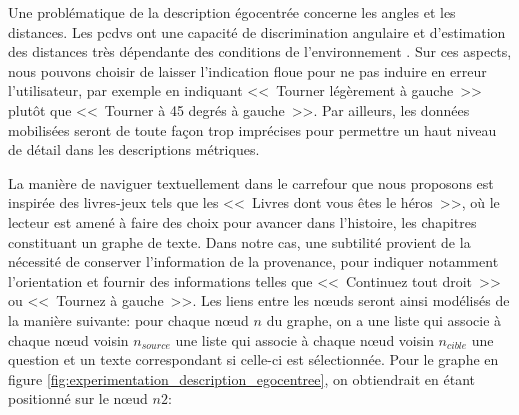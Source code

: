Une problématique de la description égocentrée concerne les angles et les distances. Les \glspl{pcdv} ont une capacité de discrimination angulaire et d’estimation des distances très dépendante des conditions de l’environnement \citep{ratelle_manuel_2019}. Sur ces aspects, nous pouvons choisir de laisser l'indication floue pour ne pas induire en erreur l'utilisateur, par exemple en indiquant <<~Tourner légèrement à gauche~>> plutôt que <<~Tourner à 45 degrés à gauche~>>. Par ailleurs, les données mobilisées seront de toute façon trop imprécises pour permettre un haut niveau de détail dans les descriptions métriques.

\newpar{}

La manière de naviguer textuellement dans le carrefour que nous proposons est inspirée des livres-jeux tels que les <<~Livres dont vous êtes le héros~>>, où le lecteur est amené à faire des choix pour avancer dans l'histoire, les chapitres constituant un graphe de texte. Dans notre cas, une subtilité provient de la nécessité de conserver l'information de la provenance, pour indiquer notamment l'orientation et fournir des informations telles que <<~Continuez tout droit~>> ou <<~Tournez à gauche~>>. Les liens entre les nœuds seront ainsi modélisés de la manière suivante: pour chaque nœud $n$ du graphe, on a une liste qui associe à chaque nœud voisin $n_{source}$ une liste qui associe à chaque nœud voisin $n_{cible}$ une question et un texte correspondant si celle-ci est sélectionnée. Pour le graphe en figure \ref{fig:experimentation_description_egocentree}, on obtiendrait en étant positionné sur le nœud $n2$:

